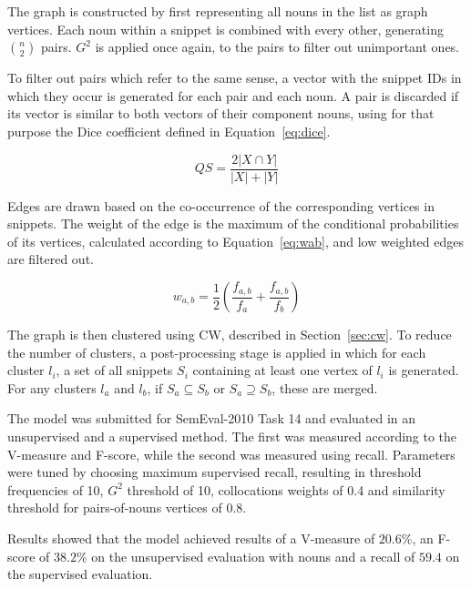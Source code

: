 The graph is constructed by first representing all nouns in the list as graph
vertices. Each noun within a snippet is combined with every other, generating
$\binom{n}{2}$ pairs. $G^2$ is applied once again, to the pairs to filter out
unimportant ones.

To filter out pairs which refer to the same sense, a vector with the snippet IDs
in which they occur is generated for each pair and each noun. A pair is
discarded if its vector is similar to both vectors of their component nouns,
using for that purpose the Dice coefficient defined in Equation~\ref{eq:dice}.

\begin{equation} \label{eq:dice}
 QS = \frac{2 |X \cap Y|}{|X| + |Y|}
\end{equation}

Edges are drawn based on the co-occurrence of the corresponding vertices in
snippets. The weight of the edge is the maximum of the conditional probabilities
of its vertices, calculated according to Equation~\ref{eq:wab}, and low weighted
edges are filtered out.

\begin{equation} \label{eq:wab}
 w_{a,b} = \frac{1}{2} \left( \frac{f_{a,b}}{f_a} + \frac{f_{a,b}}{f_b} \right)
\end{equation}

The graph is then clustered using \ac{CW}, described in Section~\ref{sec:cw}.
To reduce the number of clusters, a post-processing stage is applied in which
for each cluster $l_i$, a set of all snippets $S_i$ containing at least one
vertex of $l_i$ is generated. For any clusters $l_a$ and $l_b$, if
$S_a \subseteq S_b$  or $S_a \supseteq S_b$, these are merged.

The model was submitted for SemEval-2010 Task 14 \cite{manandhar2009semeval}
and evaluated in an unsupervised and a supervised method. The first was measured
according to the V-measure and F-score, while the second was measured using
recall. Parameters were tuned by choosing maximum supervised recall, resulting
in threshold frequencies of 10, $G^2$ threshold of 10, collocations weights of
0.4 and similarity threshold for pairs-of-nouns vertices of 0.8.

Results showed that the model achieved results of a V-measure of $20.6\%$, an
F-score of $38.2\%$ on the unsupervised evaluation with nouns and a recall of
$59.4$ on the supervised evaluation.


